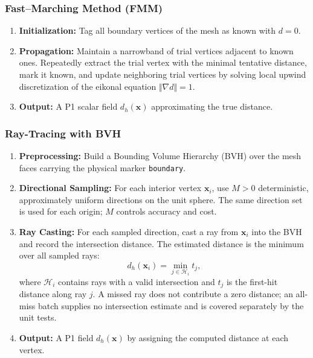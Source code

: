 \subsubsection{Fast--Marching Method (FMM)}
\begin{enumerate}
  \item \textbf{Initialization:} Tag all boundary vertices of the mesh as known with $d=0$.
  \item \textbf{Propagation:} Maintain a narrowband of trial vertices adjacent to known ones. Repeatedly extract the trial vertex with the minimal tentative distance, mark it known, and update neighboring trial vertices by solving local upwind discretization of the eikonal equation $\Vert\nabla d\Vert = 1$.
  \item \textbf{Output:} A P1 scalar field $d_h(\mathbf{x})$ approximating the true distance.
\end{enumerate}

\subsubsection{Ray-Tracing with BVH}
\begin{enumerate}
  \item \textbf{Preprocessing:} Build a Bounding Volume Hierarchy (BVH) over the mesh faces carrying the physical marker \texttt{boundary}.
  \item \textbf{Directional Sampling:} For each interior vertex $\mathbf{x}_i$, use $M>0$ deterministic, approximately uniform directions on the unit sphere. The same direction set is used for each origin; $M$ controls accuracy and cost.
  \item \textbf{Ray Casting:} For each sampled direction, cast a ray from $\mathbf{x}_i$ into the BVH and record the intersection distance. The estimated distance is the minimum over all sampled rays:
  \[ d_h(\mathbf{x}_i) = \min_{j\in\mathcal{H}_i} t_j, \]
  where $\mathcal{H}_i$ contains rays with a valid intersection and $t_j$ is the first-hit distance along ray $j$. A missed ray does not contribute a zero distance; an all-miss batch supplies no intersection estimate and is covered separately by the unit tests.
  \item \textbf{Output:} A P1 field $d_h(\mathbf{x})$ by assigning the computed distance at each vertex.
\end{enumerate}






